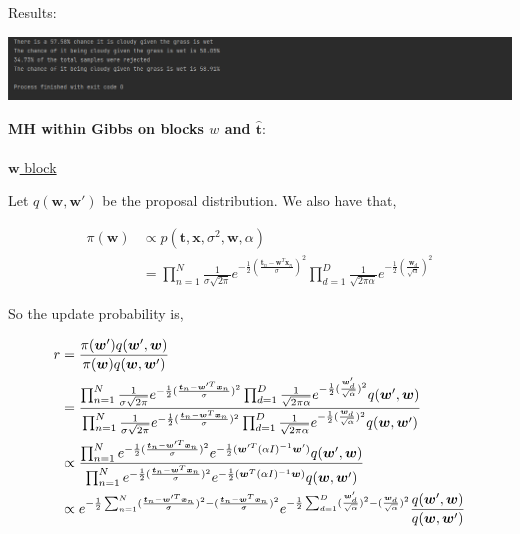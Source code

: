 \documentclass[10pt]{homeworg}
\begin{document}
Results:
\begin{center}
\includegraphics[scale=0.7]{figures/q3_results.PNG}
\end{center}



\exercise 
\textbf{MH within Gibbs on blocks $w$ and $\hat{\boldsymbol t}$}:\\
\\
\underline{$\boldsymbol w$ block}

Let $q(\boldsymbol w,\boldsymbol w')$ be the proposal distribution. We also have that,

\begin{align*}
\pi(\boldsymbol w) &\propto p(\boldsymbol t,\boldsymbol x,\sigma^2,\boldsymbol w,\alpha)\\
	   &= \prod_{n=1}^N \frac{1}{\sigma \sqrt{2\pi}} e^{-\frac{1}{2}(\frac{\boldsymbol t_n-\boldsymbol w^T \boldsymbol x_n}{\sigma})^2} \prod_{d=1}^D \frac{1}{\sqrt{2\pi\alpha}} e^{-\frac{1}{2} (\frac{\boldsymbol w_d}{\sqrt{\alpha}})^2}
\end{align*}

So the update probability is,

\begin{align*}
r &= \frac{\pi(\boldsymbol w')q(\boldsymbol w',\boldsymbol w)}{\pi(\boldsymbol w)q(\boldsymbol w, \boldsymbol w')}\\
\vspace{0.5cm}
  &= \frac{\prod_{n=1}^N \frac{1}{\sigma \sqrt{2\pi}} e^{-\frac{1}{2}(\frac{\boldsymbol t_n-\boldsymbol w'^T\boldsymbol x_n}{\sigma})^2} \prod_{d=1}^D \frac{1}{\sqrt{2\pi\alpha}} e^{-\frac{1}{2} (\frac{\boldsymbol w'_d}{\sqrt{\alpha}})^2} q(\boldsymbol w',\boldsymbol w)}{\prod_{n=1}^N \frac{1}{\sigma \sqrt{2\pi}} e^{-\frac{1}{2}(\frac{\boldsymbol t_n-\boldsymbol w^T\boldsymbol x_n}{\sigma})^2} \prod_{d=1}^D \frac{1}{\sqrt{2\pi\alpha}} e^{-\frac{1}{2} (\frac{\boldsymbol w_d}{\sqrt{\alpha}})^2} q(\boldsymbol w, \boldsymbol w')}\\
  \vspace{0.5cm}
  &\propto  \frac{\prod_{n=1}^N e^{-\frac{1}{2}(\frac{\boldsymbol t_n-\boldsymbol w'^T\boldsymbol x_n}{\sigma})^2} e^{-\frac{1}{2}(\boldsymbol w'^T(\alpha I)^{-1}\boldsymbol w')} q(\boldsymbol w',\boldsymbol w)}{\prod_{n=1}^N e^{-\frac{1}{2}(\frac{\boldsymbol t_n-\boldsymbol w^T\boldsymbol x_n}{\sigma})^2} e^{-\frac{1}{2}(\boldsymbol w^T(\alpha I)^{-1}\boldsymbol w)} q(\boldsymbol w, \boldsymbol w')}\\
  &\propto e^{-\frac{1}{2}\sum_{n=1}^N (\frac{\boldsymbol t_n-\boldsymbol w'^T\boldsymbol x_n}{\sigma})^2 - (\frac{\boldsymbol t_n-\boldsymbol w^T\boldsymbol x_n}{\sigma})^2} e^{-\frac{1}{2}\sum_{d=1}^D (\frac{\boldsymbol w'_d}{\sqrt{\alpha}})^2 - (\frac{\boldsymbol w_d}{\sqrt{\alpha}})^2}\frac{q(\boldsymbol w',\boldsymbol w)}{q(\boldsymbol w, \boldsymbol w')}
\end{align*}
\end{document}
